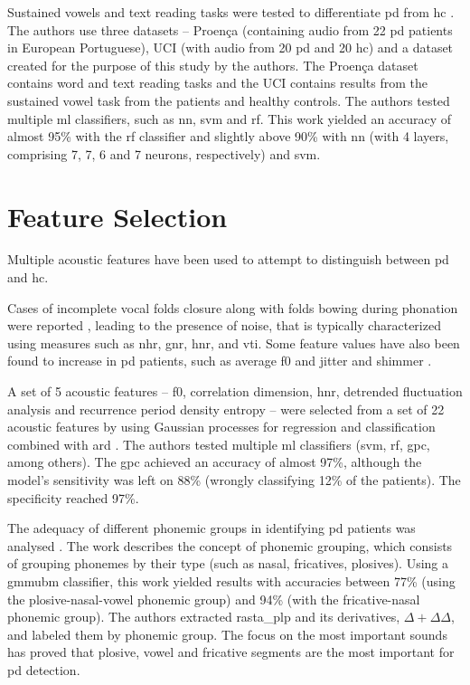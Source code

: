 Sustained vowels and text reading tasks were tested to differentiate \gls{pd} from \gls{hc} \cite{parkinson_braga}. The authors use three datasets -- Proença \cite{Proenca} (containing audio from 22 \gls{pd} patients in European Portuguese), UCI \cite{UCI} (with audio from 20 \gls{pd} and 20 \gls{hc}) and a dataset created for the purpose of this study by the authors. The Proença dataset contains word and text reading tasks and the UCI contains results from the sustained vowel task from the patients and healthy controls. The authors tested multiple \gls{ml} classifiers, such as \gls{nn}, \gls{svm} and \gls{rf}. This work yielded an accuracy of almost 95\% with the \gls{rf} classifier and slightly above 90\% with \gls{nn} (with 4 layers, comprising 7, 7, 6 and 7 neurons, respectively) and \gls{svm}.


\section{Feature Selection}

Multiple acoustic features have been used to attempt to distinguish between \gls{pd} and \gls{hc}.

Cases of incomplete vocal folds closure along with folds bowing during phonation were reported \cite{features_explained}, leading to the presence of noise, that is typically characterized using measures such as \gls{nhr}, \gls{gnr}, \gls{hnr}, and \gls{vti}. Some feature values have also been found to increase in \gls{pd} patients, such as average \gls{f0} and jitter \cite{f0_jitter} and shimmer \cite{shimmer}.

A set of 5 acoustic features -- \gls{f0}, correlation dimension,  \gls{hnr}, detrended fluctuation analysis and recurrence period density entropy -- were selected from a set of 22 acoustic features by using Gaussian processes for regression and classification combined with \gls{ard} \cite{parkinson_acoustic_despotovic}. The authors tested multiple \gls{ml} classifiers (\gls{svm}, \gls{rf}, \gls{gpc}, among others). The \gls{gpc} achieved an accuracy of almost 97\%, although the model's sensitivity was left on 88\% (wrongly classifying 12\% of the patients). The specificity reached 97\%.

The adequacy of different phonemic groups in identifying \gls{pd} patients was analysed \cite{parkinson_phonemic_relevance}. The work describes the concept of phonemic grouping, which consists of grouping phonemes by their type (such as nasal, fricatives, plosives). Using a \gls{gmmubm} classifier, this work yielded results with accuracies between 77\% (using the plosive-nasal-vowel phonemic group) and 94\% (with the fricative-nasal phonemic group). The authors extracted \gls{rasta_plp} \cite{rastaPLP} and its derivatives, $\Delta + \Delta \Delta$, and labeled them by phonemic group. The focus on the most important sounds has proved that plosive, vowel and fricative segments are the most important for \gls{pd} detection.

